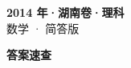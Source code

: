 \documentclass[zihao=-4, a4paper]{ctexart}
\begin{document}
\begin{center}
  {\Large\bfseries 2014 年·湖南卷·理科}\\[4pt]
  {\large 数学 · 简答版}
\end{center}
\medskip
{}

\clearpage
{}
\begin{center}{\Large\bfseries 答案速查}\end{center}
\medskip

\end{document}
